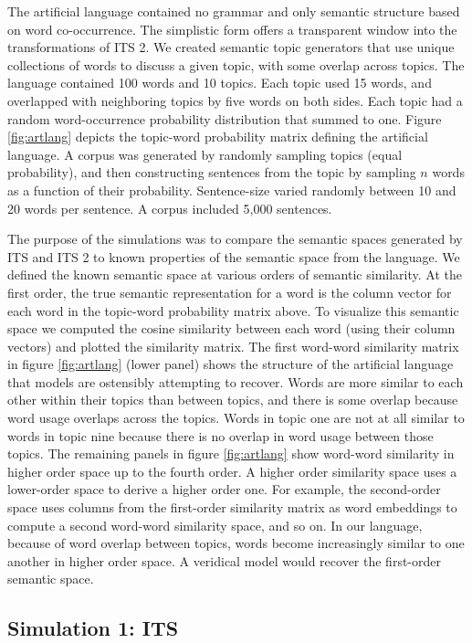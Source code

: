 \documentclass[10pt,letterpaper]{article}
\begin{document}
The artificial language contained no grammar and only semantic structure based on word co-occurrence. The simplistic form offers a transparent window into the transformations of ITS 2. We created semantic topic generators that use unique collections of words to discuss a given topic, with some overlap across topics. The language contained 100 words and 10 topics. Each topic used 15 words, and overlapped with neighboring topics by five words on both sides. Each topic had a random word-occurrence probability distribution that summed to one. Figure \ref{fig:artlang} depicts the topic-word probability matrix defining the artificial language. A corpus was generated by randomly sampling topics (equal probability), and then constructing sentences from the topic by sampling \(n\) words as a function of their probability. Sentence-size varied randomly between 10 and 20 words per sentence. A corpus included 5,000 sentences.

The purpose of the simulations was to compare the semantic spaces generated by ITS and ITS 2 to known properties of the semantic space from the language. We defined the known semantic space at various orders of semantic similarity. At the first order, the true semantic representation for a word is the column vector for each word in the topic-word probability matrix above. To visualize this semantic space we computed the cosine similarity between each word (using their column vectors) and plotted the similarity matrix. The first word-word similarity matrix in figure \ref{fig:artlang} (lower panel) shows the structure of the artificial language that models are ostensibly attempting to recover. Words are more similar to each other within their topics than between topics, and there is some overlap because word usage overlaps across the topics. Words in topic one are not at all similar to words in topic nine because there is no overlap in word usage between those topics. The remaining panels in figure \ref{fig:artlang} show word-word similarity in higher order space up to the fourth order. A higher order similarity space uses a lower-order space to derive a higher order one. For example, the second-order space uses columns from the first-order similarity matrix as word embeddings to compute a second word-word similarity space, and so on. In our language, because of word overlap between topics, words become increasingly similar to one another in higher order space. A veridical model would recover the first-order semantic space.

\subsection{Simulation 1: ITS}
\end{document}
